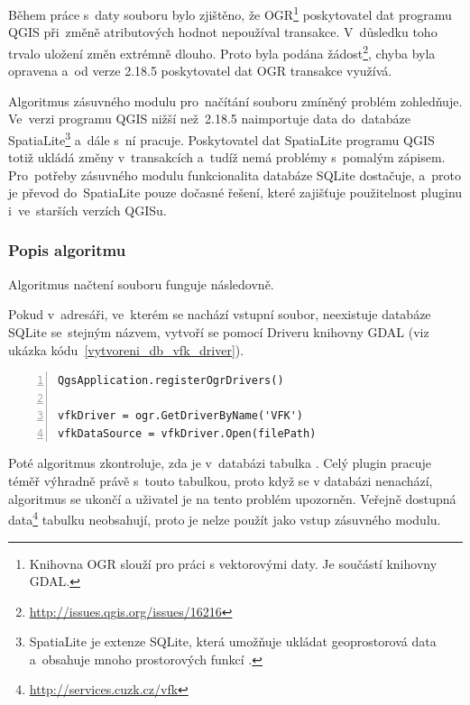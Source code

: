 Během práce s~daty souboru  bylo zjištěno, že OGR\footnote{Knihovna OGR
slouží pro práci s vektorovými daty. Je součástí knihovny GDAL.} poskytovatel
dat programu QGIS při~změně atributových hodnot nepoužíval
transakce. V~důsledku toho trvalo uložení změn extrémně dlouho. Proto
byla podána
žádost\footnote{\url{http://issues.qgis.org/issues/16216}}, chyba
byla opravena a~od verze 2.18.5 poskytovatel dat OGR transakce
využívá.

Algoritmus zásuvného modulu pro~načítání  souboru zmíněný
problém zo\-hledňuje. Ve~verzi programu QGIS nižší než~2.18.5
naimportuje data do~databáze SpatiaLite\footnote{SpatiaLite je extenze
SQLite, která umožňuje ukládat geoprostorová data a~obsahuje mnoho
prostorových funkcí \citep{spatialite} \citep{wiki_spatialite}.}
a~dále s~ní pracuje. Poskytovatel dat SpatiaLite programu
QGIS totiž ukládá změny v~transakcích a~tudíž nemá problémy s~pomalým
zápisem. Pro~potřeby zásuvného modulu funkcionalita databáze SQLite
dostačuje, a~proto je převod do~SpatiaLite pouze dočasné řešení, které
zajišťuje použitelnost pluginu i~ve~starších verzích QGISu.


\subsubsection{Popis algoritmu}
\label{popis_algoritmu_nacteni_vfk}

Algoritmus načtení  souboru funguje následovně.

Pokud v~adresáři, ve~kterém se nachází vstupní  soubor,
neexistuje databáze SQLite se~stejným názvem, vytvoří se pomocí
 Driveru knihovny GDAL (viz ukázka
kódu~\ref{vytvoreni_db_vfk_driver}).

{\scriptsize
\begin{lstlisting}[style=python, caption={Vytvoření SQLite databáze
pomocí VFK Driveru}, captionpos=b, label=vytvoreni_db_vfk_driver,
backgroundcolor = \color{light-gray}, numbers=left]
QgsApplication.registerOgrDrivers()

vfkDriver = ogr.GetDriverByName('VFK')
vfkDataSource = vfkDriver.Open(filePath)
\end{lstlisting}}

Poté algoritmus zkontroluje, zda je v~databázi tabulka
\texttt{}. Celý plugin pracuje téměř výhradně právě s~touto
tabulkou, proto když se v databázi nenachází, algoritmus se
ukončí a uživatel je na tento problém upozorněn. Veřejně dostupná 
data\footnote{\url{http://services.cuzk.cz/vfk}} tabulku \texttt{}
neobsahují, proto je nelze použít jako vstup zásuvného modulu.

